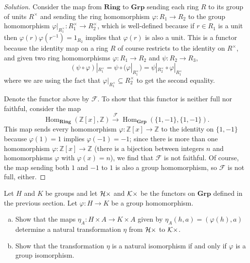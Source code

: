 \documentclass[10pt]{article}
\providecommand{\ZZ}{\mathbb Z}
\providecommand{\ii}{\item}
\providecommand{\inv}{^{-1}}
\newenvironment{soln}{\begin{proof}[Solution]}{\end{proof}}
\begin{document}
\begin{soln}
    Consider the map from $\mathbf{Ring}$ to $\mathbf{Grp}$
    sending each ring $R$ to its group of units $R^\times$ and
    sending the ring homomorphism $\varphi\colon R_1\to R_2$
    to the group homomorphism
    $\varphi|_{R_1^\times}\colon R_1^\times\to R_2^\times$,
    which is well-defined because if $r\in R_1$ is a unit then
    $\varphi(r)\varphi(r\inv) = 1_{R_2}$ implies that
    $\varphi(r)$ is also a unit. This is a functor because
    the identity map on a ring $R$ of course restricts to
    the identity on $R^\times$, and given two ring homomorphisms
    $\varphi\colon R_1\to R_2$ and $\psi\colon R_2\to R_3$,
    \begin{equation*}
	(\psi\circ\varphi)|_{R_1^\times}
	= \psi\circ(\varphi|_{R_1^\times})
	= \psi|_{R_2^\times}\circ\varphi|_{R_1^\times}
    \end{equation*}
    where we are using the fact that
    $\varphi|_{R_1^\times}\subseteq R_2^\times$ to get the second equality.

    Denote the functor above by $\mathcal F$.
    To show that this functor is neither full nor faithful,
    consider the map
    \begin{equation*}
	\operatorname{Hom}_{\mathbf{Ring}}(\ZZ[x],\ZZ)\overset{\mathcal F}\to
	\operatorname{Hom}_{\mathbf{Grp}}(\{1,-1\},\{1,-1\}).
    \end{equation*}
    This map sends every homomorphism $\varphi\colon\ZZ[x]\to\ZZ$
    to the identity on $\{1,-1\}$ because $\varphi(1) = 1$
    implies $\varphi(-1) = -1$; since there is more than one homomorphism
    $\varphi\colon \ZZ[x]\to\ZZ$ (there is a bijection between integers $n$
    and homomorphisms $\varphi$ with $\varphi(x) = n$),
    we find that $\mathcal F$ is not faithful. Of course, the map sending
    both $1$ and $-1$ to $1$ is also a group homomorphism,
    so $\mathcal F$ is not full, either.
\end{soln}

\pagebreak

\begin{problem}
    [Appendix II \S2 \#2]
    Let $H$ and $K$ be groups and let $\mathcal H{\times}$ and $\mathcal K{\times}$
    be the functors on $\mathbf{Grp}$ defined in the previous section.
    Let $\varphi\colon H\to K$ be a group homomorphism.
    \begin{enumerate}[(a)]
        \ii Show that the maps $\eta_A\colon H\times A\to K\times A$
	given by $\eta_A(h,a) = (\varphi(h),a)$ determine
	a natural transformation $\eta$ from $\mathcal H{\times}$ to $\mathcal K{\times}$.
	\ii Show that the transformation $\eta$ is a natural isomorphism
	if and only if $\varphi$ is a group isomorphism.
    \end{enumerate}
\end{problem}
\end{document}
